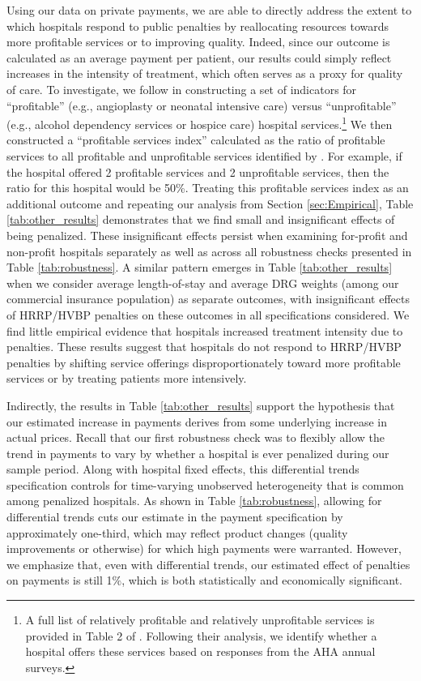 \documentclass[12pt]{article}
\begin{document}
Using our data on private payments, we are able to directly address the extent to which hospitals respond to public penalties by reallocating resources towards more profitable services or to improving quality.  Indeed, since our outcome is calculated as an average payment per patient, our results could simply reflect increases in the intensity of treatment, which often serves as a proxy for quality of care.    To investigate, we follow \cite{horwitz2009} in constructing a set of indicators for ``profitable'' (e.g., angioplasty or neonatal intensive care) versus ``unprofitable'' (e.g., alcohol dependency services or hospice care) hospital services.\footnote{A full list of relatively profitable and relatively unprofitable services is provided in Table 2 of \cite{horwitz2009}. Following their analysis, we identify whether a hospital offers these services based on responses from the AHA annual surveys.} We then constructed a ``profitable services index'' calculated as the ratio of profitable services to all profitable and unprofitable services identified by \cite{horwitz2009}. For example, if the hospital offered 2 profitable services and 2 unprofitable services, then the ratio for this hospital would be 50\%. Treating this profitable services index as an additional outcome and repeating our analysis from Section \ref{sec:Empirical}, Table \ref{tab:other_results} demonstrates that we find small and insignificant effects of being penalized. These insignificant effects persist when examining for-profit and non-profit hospitals separately as well as across all robustness checks presented in Table \ref{tab:robustness}.  A similar pattern emerges in Table \ref{tab:other_results} when we consider average length-of-stay and average DRG weights (among our commercial insurance population) as separate outcomes, with insignificant effects of HRRP/HVBP penalties on these outcomes in all specifications considered.  We find little empirical evidence that hospitals increased treatment intensity due to penalties.  These results suggest that hospitals do not respond to HRRP/HVBP penalties by shifting service offerings disproportionately toward more profitable services or by treating patients more intensively.

Indirectly, the results in Table \ref{tab:other_results} support the hypothesis that our estimated increase in payments derives from some underlying increase in actual prices.  Recall that our first robustness check was to flexibly allow the trend in payments to vary by whether a hospital is ever penalized during our sample period.   Along with hospital fixed effects, this differential trends specification controls for time-varying unobserved heterogeneity that is common among penalized hospitals.  As shown in Table \ref{tab:robustness}, allowing for differential trends cuts our estimate in the payment specification by approximately one-third, which may reflect product changes (quality improvements or otherwise) for which high payments were warranted.  However, we emphasize that, even with differential trends, our estimated effect of penalties on payments is still 1$\%$, which is both statistically and economically significant.
\end{document}

